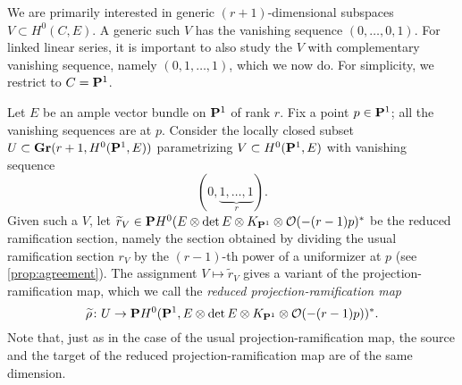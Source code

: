 We are primarily interested in generic $(r+1)$-dimensional subspaces $V \subset H^0(C, E)$.
A generic such $V$ has the vanishing sequence $(0, \dots, 0, 1)$.
For linked linear series, it is important to also study the $V$ with complementary vanishing sequence, namely
$(0,1, \dots, 1)$,
which we now do.
For simplicity, we restrict to $C = \P^1$.

Let $E$ be an ample vector bundle on $\P^1$ of rank $r$.
Fix a point $p \in \P^1$; all the vanishing sequences are at $p$.
Consider  the locally closed subset $U \subset \Gr(r+1, H^0(\P^1, E))$ parametrizing $V \subset H^0(\P^1, E)$ with vanishing sequence
\[ (0,\underbrace{1,\dots, 1}_{r}).\]
Given such a $V$, let $\widetilde r_V \in \P H^0(E \otimes \det E \otimes K_{\P^1} \otimes \O(-(r-1)p)^*$ be the reduced ramification section, namely the section obtained by dividing the usual ramification section $r_V$ by the $(r-1)$-th power of a uniformizer at $p$ (see \autoref{prop:agreement}).
The assignment $V \mapsto \widetilde r_V$ gives a variant of the projection-ramification map, which we call the \emph{reduced projection-ramification map}
\begin{equation}\label{eqn:rrd}
  \widetilde \rho \from U \to \P H^0(\P^1, E \otimes \det E \otimes K_{\P^1} \otimes \O(-(r-1)p))^*.
\end{equation}
Note that, just as in the case of the usual projection-ramification map, the source and the target of the reduced projection-ramification map are of the same dimension.

